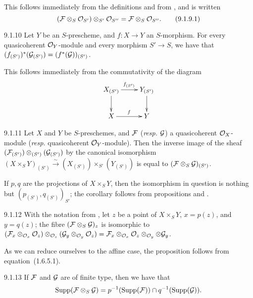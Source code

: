 This follows immediately from the definitions and from , and is
written
\[
  (\mathcal{F}\otimes_S\mathcal{O}_{S'})\otimes_{S'}\mathcal{O}_{S''}=\mathcal{F}\otimes_S\mathcal{O}_{S''}.\tag{9.1.9.1}
\]

\begin{env}[Proposition]{9.1.10}
\label{prop-1.9.1.10}
Let $Y$ be an $S$-prescheme, and $f\colon X\to Y$ an $S$-morphism.
For every quasicoherent $\mathcal{O}_Y$-module and every morphism
$S'\to S$, we have that
$(f_{(S')})^\ast(\mathcal{G}_{(S')})=(f^\ast(\mathcal{G}))_{(S')}$.
\end{env}

This follows immediately from the commutativity of the diagram 
\[
  \xymatrix{
    X_{(S')}\ar[r]^{f_{(S')}}\ar[d] & Y_{(S')}\ar[d]\\
    X\ar[r]^f & Y
  }
\]

\begin{env}[Corollary]{9.1.11}
\label{cor-1.9.1.11}
Let $X$ and $Y$ be $S$-preschemes, and
$\mathcal{F}$ (\emph{resp.} $\mathcal{G}$) a quasicoherent $\mathcal{O}_X$-module
(\emph{resp.} quasicoherent $\mathcal{O}_Y$-module). Then the inverse image of the sheaf
$(\mathcal{F}_{(S')})\otimes_{(S')}(\mathcal{G}_{(S')})$ by the canonical isomorphism
$(X\times_S Y)_{(S')}\xrightarrow{\sim}(X_{(S')})\times_{S'}(Y_{(S')})$
 is equal to $(\mathcal{F}\otimes_S\mathcal{G})_{(S')}$.
\end{env}

If $p,q$ are the projections of $X\times_S Y$, then the isomorphism in question
is nothing but $(p_{(S')}, q_{(S')})_{S'}$; the corollary follows from
propositions  and .

\begin{env}[Proposition]{9.1.12}
\label{prop-1.9.1.12}
With the notation from , let $z$ be
a point of $X\times_S Y$, $x=p(z)$, and $y=q(z)$; the fibre
$(\mathcal{F}\otimes_S\mathcal{G})_z$ is isomorphic to
$(\mathcal{F}_x\otimes_{\mathcal{O}_x}\mathcal{O}_z)\otimes_{\mathcal{O}_z}(\mathcal{G}_y\otimes_{\mathcal{O}_y}\mathcal{O}_z)
=\mathcal{F}_x\otimes_{\mathcal{O}_x}\mathcal{O}_z\otimes_{\mathcal{O}_y}\otimes\mathcal{G}_y$.
\end{env}

As we can reduce ourselves to the affine case, the proposition follows from
equation~(1.6.5.1).

\begin{env}[Corollary]{9.1.13}
\label{cor-1.9.1.13}
If $\mathcal{F}$ and $\mathcal{G}$ are of finite type, then we have that
\[
  \operatorname{Supp}(\mathcal{F}\otimes_S\mathcal{G})
  =p^{-1}(\operatorname{Supp}(\mathcal{F}))\cap q^{-1}(\operatorname{Supp}(\mathcal{G})).
\]
\end{env}

